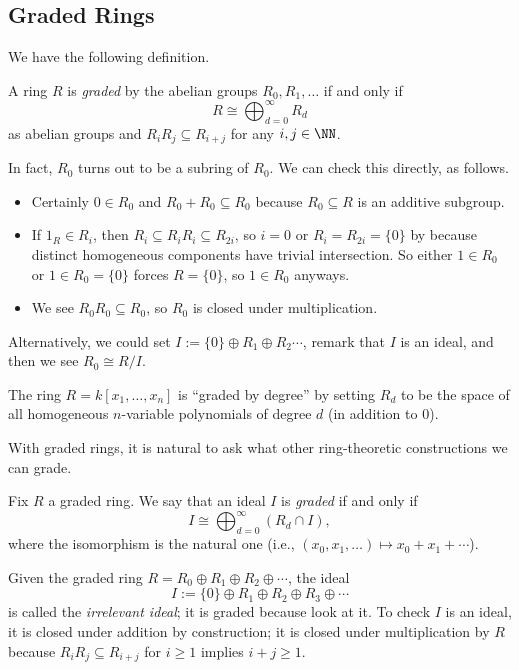 \subsection{Graded Rings}
We have the following definition.
\begin{definition}
	A ring $R$ is \textit{graded} by the abelian groups $R_0,R_1,\ldots$ if and only if
	\[R\cong\bigoplus_{d=0}^\infty R_d\]
	as abelian groups and $R_iR_j\subseteq R_{i+j}$ for any $i,j\in\NN$.
\end{definition}
\begin{remark}[Nir]
	In fact, $R_0$ turns out to be a subring of $R_0$. We can check this directly, as follows.
	\begin{itemize}
		\item Certainly $0\in R_0$ and $R_0+R_0\subseteq R_0$ because $R_0\subseteq R$ is an additive subgroup.
		\item If $1_R\in R_i$, then $R_i\subseteq R_iR_i\subseteq R_{2i}$, so $i=0$ or $R_i=R_{2i}=\{0\}$ by because distinct homogeneous components have trivial intersection. So either $1\in R_0$ or $1\in R_0=\{0\}$ forces $R=\{0\}$, so $1\in R_0$ anyways.
		\item We see $R_0R_0\subseteq R_0$, so $R_0$ is closed under multiplication.
	\end{itemize}
	Alternatively, we could set $I:=\{0\}\oplus R_1\oplus R_2\cdots$, remark that $I$ is an ideal, and then we see $R_0\cong R/I$.
\end{remark}
\begin{example}
	The ring $R=k[x_1,\ldots,x_n]$ is ``graded by degree'' by setting $R_d$ to be the space of all homogeneous $n$-variable polynomials of degree $d$ (in addition to $0$).
\end{example}
With graded rings, it is natural to ask what other ring-theoretic constructions we can grade.
\begin{definition}
	Fix $R$ a graded ring. We say that an ideal $I$ is \textit{graded} if and only if
	\[I\cong\bigoplus_{d=0}^\infty(R_d\cap I),\]
	where the isomorphism is the natural one (i.e., $(x_0,x_1,\ldots)\mapsto x_0+x_1+\cdots$).
\end{definition}
\begin{example}
	Given the graded ring $R=R_0\oplus R_1\oplus R_2\oplus\cdots$, the ideal
	\[I:=\{0\}\oplus R_1\oplus R_2\oplus R_3\oplus\cdots\]
	is called the \textit{irrelevant ideal}; it is graded because look at it. To check $I$ is an ideal, it is closed under addition by construction; it is closed under multiplication by $R$ because $R_iR_j\subseteq R_{i+j}$ for $i\ge1$ implies $i+j\ge1$.
\end{example}
